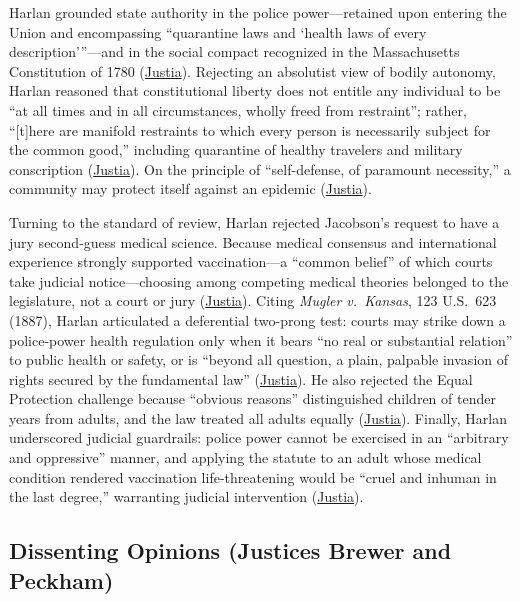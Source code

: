 \documentclass[12pt]{article}
\begin{document}
Harlan grounded state authority in the police power---retained upon entering the Union and encompassing ``quarantine laws and `health laws of every description'''---and in the social compact recognized in the Massachusetts Constitution of 1780 (\href{https://supreme.justia.com/cases/federal/us/197/11/}{Justia}). Rejecting an absolutist view of bodily autonomy, Harlan reasoned that constitutional liberty does not entitle any individual to be ``at all times and in all circumstances, wholly freed from restraint''; rather, ``[t]here are manifold restraints to which every person is necessarily subject for the common good,'' including quarantine of healthy travelers and military conscription (\href{https://supreme.justia.com/cases/federal/us/197/11/}{Justia}). On the principle of ``self-defense, of paramount necessity,'' a community may protect itself against an epidemic (\href{https://supreme.justia.com/cases/federal/us/197/11/}{Justia}).

Turning to the standard of review, Harlan rejected Jacobson's request to have a jury second-guess medical science. Because medical consensus and international experience strongly supported vaccination---a ``common belief'' of which courts take judicial notice---choosing among competing medical theories belonged to the legislature, not a court or jury (\href{https://supreme.justia.com/cases/federal/us/197/11/}{Justia}). Citing \textit{Mugler v.\ Kansas}, 123 U.S.\ 623 (1887), Harlan articulated a deferential two-prong test: courts may strike down a police-power health regulation only when it bears ``no real or substantial relation'' to public health or safety, or is ``beyond all question, a plain, palpable invasion of rights secured by the fundamental law'' (\href{https://supreme.justia.com/cases/federal/us/197/11/}{Justia}). He also rejected the Equal Protection challenge because ``obvious reasons'' distinguished children of tender years from adults, and the law treated all adults equally (\href{https://supreme.justia.com/cases/federal/us/197/11/}{Justia}). Finally, Harlan underscored judicial guardrails: police power cannot be exercised in an ``arbitrary and oppressive'' manner, and applying the statute to an adult whose medical condition rendered vaccination life-threatening would be ``cruel and inhuman in the last degree,'' warranting judicial intervention (\href{https://supreme.justia.com/cases/federal/us/197/11/}{Justia}).

\subsection{Dissenting Opinions (Justices Brewer and Peckham)}
\end{document}
